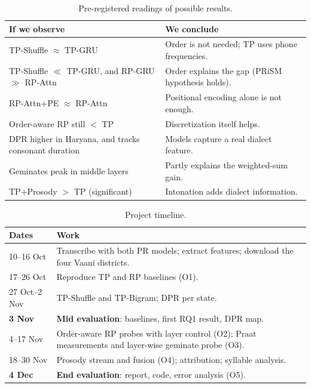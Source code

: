 \documentclass[11pt]{article}
\begin{document}
\begin{table}[t]
\centering
\small
\begin{tabularx}{\columnwidth}{@{}>{\raggedright\arraybackslash}p{}X@{}}
\toprule
\textbf{If we observe} & \textbf{We conclude} \\
\midrule
TP-Shuffle $\approx$ TP-GRU & Order is not needed; TP uses phone frequencies. \\
TP-Shuffle $\ll$ TP-GRU, and RP-GRU $\gg$ RP-Attn & Order explains the gap (PRiSM hypothesis holds). \\
RP-Attn+PE $\approx$ RP-Attn & Positional encoding alone is not enough. \\
Order-aware RP still $<$ TP & Discretization itself helps. \\
DPR higher in Haryana, and tracks consonant duration & Models capture a real dialect feature. \\
Geminates peak in middle layers & Partly explains the weighted-sum gain. \\
TP+Prosody $>$ TP (significant) & Intonation adds dialect information. \\
\bottomrule
\end{tabularx}
\caption{Pre-registered readings of possible results.}
\label{tab:outcomes}
\end{table}

\begin{table}[t]
\centering
\small
\begin{tabularx}{\columnwidth}{@{}lX@{}}
\toprule
\textbf{Dates} & \textbf{Work} \\
\midrule
10--16 Oct & Transcribe with both PR models; extract features; download the four Vaani districts. \\
17--26 Oct & Reproduce TP and RP baselines (O1). \\
27 Oct--2 Nov & TP-Shuffle and TP-Bigram; DPR per state. \\
\textbf{3 Nov} & \textbf{Mid evaluation}: baselines, first RQ1 result, DPR map. \\
4--17 Nov & Order-aware RP probes with layer control (O2); Praat measurements and layer-wise geminate probe (O3). \\
18--30 Nov & Prosody stream and fusion (O4); attribution; syllable analysis. \\
\textbf{4 Dec} & \textbf{End evaluation}: report, code, error analysis (O5). \\
\bottomrule
\end{tabularx}
\caption{Project timeline.}
\label{tab:timeline}
\end{table}
\end{document}
